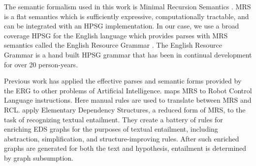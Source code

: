 The semantic formalism used in this work is Minimal Recursion Semantics \cite{copestake2005minimal}. 
MRS is a flat semantics which is sufficiently expressive, computationally tractable, and can be integrated with an HPSG implementation. 
In our case, we use a broad coverage HPSG for the English language which provides parses with MRS semantics called the English Resource Grammar \cite{flickinger2000building,flickinger2011accuracy}.
The English Resource Grammar is a hand built HPSG grammar that has been in continual development for over 20 person-years. 

Previous work has applied the effective parses and semantic forms provided by the ERG to other problems of Artificial Intelligence. 
 maps MRS to Robot Control Language instructions. 
Here manual rules are used to translate between MRS and RCL. 
 apply Elementary Dependency Structures, a reduced form of MRS, to the task of recognizing textual entailment. 
They create a battery of rules for enriching EDS graphs for the purposes of textual entailment, including abstraction, simplification, and structure-improving rules. 
After such enriched graphs are generated for both the text and hypothesis, entailment is determined by graph subsumption.

